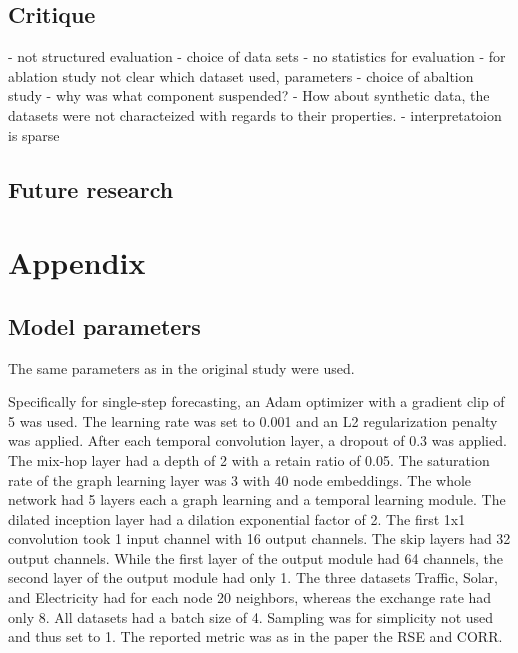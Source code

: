 \documentclass[letterpaper,twocolumn,11pt]{article}
\begin{document}
    \subsection{Critique}
    - not structured evaluation
    - choice of data sets
    - no statistics for evaluation
    - for ablation study not clear which dataset used, parameters
    - choice of abaltion study - why was what component suspended?
    - How about synthetic data, the datasets were not characteized with regards to their properties.
    - interpretatoion is sparse


    \subsection{Future research}

    {\footnotesize 
    }




   \section{Appendix}

   \subsection{Model parameters}\label{model_parameters}
   The same parameters as in the original study were used.

   Specifically for single-step forecasting, an Adam optimizer with a gradient clip of 5 was used.
   The learning rate was set to 0.001 and an L2 regularization penalty was applied.
   After each temporal convolution layer, a dropout of 0.3 was applied.
   The mix-hop layer had a depth of 2 with a retain ratio of 0.05.
   The saturation rate of the graph learning layer was 3 with 40 node embeddings.
   The whole network had 5 layers each a graph learning and a temporal learning module.
   The dilated inception layer had a dilation exponential factor of 2.
   The first 1x1 convolution took 1 input channel with 16 output channels.
   The skip layers had 32 output channels.
   While the first layer of the output module had 64 channels, the second layer of the output module had only 1.
   The three datasets Traffic, Solar, and Electricity had for each node 20 neighbors, whereas the exchange rate had only 8.
   All datasets had a batch size of 4.
   Sampling was for simplicity not used and thus set to 1.
   The reported metric was as in the paper the RSE and CORR.
\end{document}
